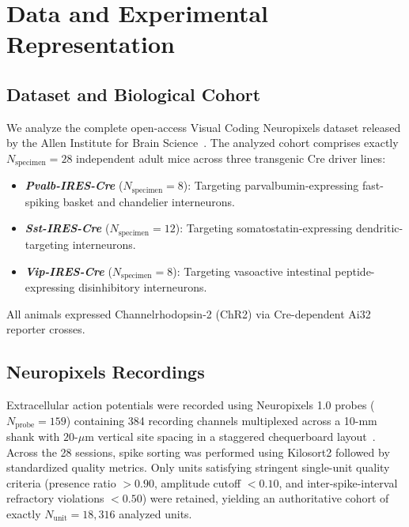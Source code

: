 \documentclass[10pt,journal,compsoc]{IEEEtran}
\begin{document}
\section{Data and Experimental Representation}

\subsection{Dataset and Biological Cohort}
We analyze the complete open-access Visual Coding Neuropixels dataset released by the Allen Institute for Brain Science~\cite{siegle2021survey}. The analyzed cohort comprises exactly $N_{\text{specimen}} = 28$ independent adult mice across three transgenic Cre driver lines:
\begin{itemize}
    \item \textbf{\textit{Pvalb-IRES-Cre}} ($N_{\text{specimen}} = 8$): Targeting parvalbumin-expressing fast-spiking basket and chandelier interneurons.
    \item \textbf{\textit{Sst-IRES-Cre}} ($N_{\text{specimen}} = 12$): Targeting somatostatin-expressing dendritic-targeting interneurons.
    \item \textbf{\textit{Vip-IRES-Cre}} ($N_{\text{specimen}} = 8$): Targeting vasoactive intestinal peptide-expressing disinhibitory interneurons.
\end{itemize}
All animals expressed Channelrhodopsin-2 (ChR2) via Cre-dependent Ai32 reporter crosses.

\subsection{Neuropixels Recordings}
Extracellular action potentials were recorded using Neuropixels 1.0 probes ($N_{\text{probe}} = 159$) containing 384 recording channels multiplexed across a 10-mm shank with $20$-$\mu\text{m}$ vertical site spacing in a staggered chequerboard layout~\cite{jun2017fully}. Across the 28 sessions, spike sorting was performed using Kilosort2 followed by standardized quality metrics. Only units satisfying stringent single-unit quality criteria (presence ratio $>0.90$, amplitude cutoff $<0.10$, and inter-spike-interval refractory violations $<0.50$) were retained, yielding an authoritative cohort of exactly $N_{\text{unit}} = 18,316$ analyzed units.
\end{document}
